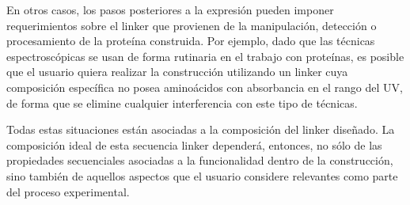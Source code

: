 En otros casos, los pasos posteriores a la expresión pueden imponer requerimientos sobre el linker que provienen de la manipulación, detección o procesamiento de la proteína construida.
Por ejemplo, dado que las técnicas espectroscópicas se usan de forma rutinaria en el trabajo con proteínas, es posible que el usuario 
quiera realizar la construcción utilizando un linker cuya composición específica no posea aminoácidos con absorbancia en el rango del UV, 
de forma que se elimine cualquier interferencia con este tipo de técnicas.

Todas estas situaciones están asociadas a la composición del linker diseñado. 
La composición ideal de esta secuencia linker dependerá, entonces, no sólo de las propiedades secuenciales asociadas a la funcionalidad dentro de la construcción, sino también de aquellos aspectos 
que el usuario considere relevantes como parte del proceso experimental.






% 
% 
% 
% 
% 
% 
% 
% 
% 
% 


























